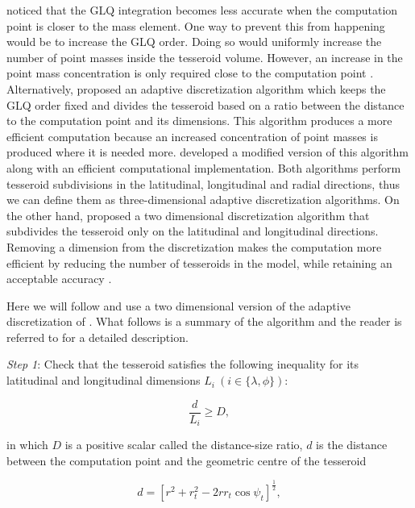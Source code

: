\documentclass[extra, referee]{gji}
\begin{document}
\citet{Ku1977} noticed that the GLQ integration
becomes less accurate when the computation point is closer to the
mass element.
One way to prevent this from happening would be to increase the GLQ order.
Doing so would uniformly increase the number of point masses inside the
tesseroid volume.
However, an increase in the point mass concentration is only required close to the
computation point \citep{Uieda2016}.
Alternatively, \citet{Li2011} proposed an adaptive
discretization algorithm which keeps the GLQ order fixed and divides the
tesseroid based on a ratio between the distance to the computation
point and its dimensions.
This algorithm produces a more efficient computation because an increased concentration
of point masses is produced where it is needed more.
\citet{Uieda2016} developed a modified version of this algorithm along with an efficient
computational implementation.
Both algorithms perform tesseroid subdivisions in the latitudinal,
longitudinal and radial directions, thus we can define them as three-dimensional
adaptive discretization algorithms.
On the other hand, \citet{Lin2018} proposed a two dimensional discretization algorithm
that subdivides the tesseroid only on the latitudinal and longitudinal directions.
Removing a dimension from the discretization makes the computation more efficient by
reducing the number of tesseroids in the model, while
retaining an acceptable accuracy \citep{Lin2018}.

Here we will follow \citet{Lin2018} and use a two dimensional version of the adaptive
discretization of \citet{Uieda2016}.
What follows is a summary of the algorithm and the reader is referred to
\citet{Uieda2016} for a detailed description.

\textit{Step 1}: Check that the tesseroid satisfies the following inequality for its
latitudinal and longitudinal dimensions $L_i\ (i \in \{\lambda, \phi\})$:

\begin{equation}
    \frac{d}{L_i} \geq D,
    \label{eq:condition}
\end{equation}

\noindent
in which $D$ is a positive scalar called the distance-size ratio, $d$ is the distance
between the computation point and the geometric centre of the tesseroid

\begin{equation}
    d = \left[
        r^2 + r_t^2 - 2 r r_t \cos\psi_t
        \right]^{\frac{1}{2}} ,
    \label{eq:distance}
\end{equation}
\end{document}
